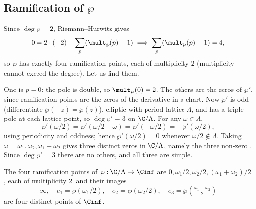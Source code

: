 \subsection{Ramification of $\wp$}

Since $\deg\wp = 2$, Riemann--Hurwitz gives
$$
0 = 2\cdot(-2) + \sum_p(\mult_\wp(p)-1) \implies \sum_p(\mult_\wp(p)-1) = 4,
$$
so $\wp$ has exactly four ramification points, each of multiplicity $2$ (multiplicity
cannot exceed the degree). Let us find them.

One is $p = 0$: the pole is double, so $\mult_\wp(0)=2$. The others are the zeros of
$\wp'$, since ramification points are the zeros of the derivative in a chart. Now $\wp'$
is odd (differentiate $\wp(-z)=\wp(z)$),
elliptic with period lattice $\Lambda$, and has a triple pole at each lattice point, so
$\deg\wp' = 3$ on $\C/\Lambda$. For any $\omega\in\Lambda$,
$$
\wp'(\omega/2) = \wp'(\omega/2 - \omega) = \wp'(-\omega/2) = -\wp'(\omega/2),
$$
using periodicity and oddness; hence $\wp'(\omega/2) = 0$ whenever $\omega/2\notin\Lambda$.
Taking $\omega = \omega_1, \omega_2, \omega_1+\omega_2$ gives three distinct zeros in
$\C/\Lambda$, namely the three non-zero . Since $\deg \wp'=3$ there are
no others, and all three are simple.

\begin{center}
\end{center}

\begin{proposition}\label{prop:wpbranch}
	The four ramification points of $\wp : \C/\Lambda \to \Cinf$ are
	$0, \omega_1/2, \omega_2/2, (\omega_1+\omega_2)/2$, each of multiplicity $2$, and their
	images
	$$
	\infty, \quad e_1 = \wp(\omega_1/2), \quad e_2 = \wp(\omega_2/2), \quad e_3 = \wp\!\left(\tfrac{\omega_1+\omega_2}{2}\right)
	$$
	are four distinct points of $\Cinf$.
\end{proposition}

